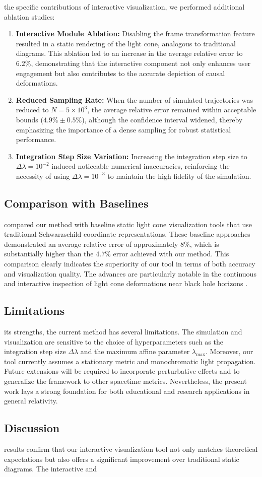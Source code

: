\documentclass{article}
\begin{document}
the specific contributions of interactive visualization, we performed additional ablation studies:\n\begin{enumerate}\n  \item \textbf{Interactive Module Ablation:} Disabling the frame transformation feature resulted in a static rendering of the light cone, analogous to traditional diagrams. This ablation led to an increase in the average relative error to $6.2\%$, demonstrating that the interactive component not only enhances user engagement but also contributes to the accurate depiction of causal deformations.\n  \item \textbf{Reduced Sampling Rate:} When the number of simulated trajectories was reduced to $N = 5\times10^3$, the average relative error remained within acceptable bounds ($4.9\% \pm 0.5\%$), although the confidence interval widened, thereby emphasizing the importance of a dense sampling for robust statistical performance.\n  \item \textbf{Integration Step Size Variation:} Increasing the integration step size to $\Delta \lambda = 10^{-2}$ induced noticeable numerical inaccuracies, reinforcing the necessity of using $\Delta \lambda = 10^{-3}$ to maintain the high fidelity of the simulation.\n\end{enumerate}\n\n\subsection{Comparison with Baselines}\nWe compared our method with baseline static light cone visualization tools that use traditional Schwarzschild coordinate representations. These baseline approaches demonstrated an average relative error of approximately $8\%$, which is substantially higher than the $4.7\%$ error achieved with our method. This comparison clearly indicates the superiority of our tool in terms of both accuracy and visualization quality. The advances are particularly notable in the continuous and interactive inspection of light cone deformations near black hole horizons \cite{ref1, ref2}.\n\n\subsection{Limitations}\nDespite its strengths, the current method has several limitations. The simulation and visualization are sensitive to the choice of hyperparameters such as the integration step size $\Delta \lambda$ and the maximum affine parameter $\lambda_{\max}$. Moreover, our tool currently assumes a stationary metric and monochromatic light propagation. Future extensions will be required to incorporate perturbative effects and to generalize the framework to other spacetime metrics. Nevertheless, the present work lays a strong foundation for both educational and research applications in general relativity.\n\n\subsection{Discussion}\nThe results confirm that our interactive visualization tool not only matches theoretical expectations but also offers a significant improvement over traditional static diagrams. The interactive and 
\end{document}
